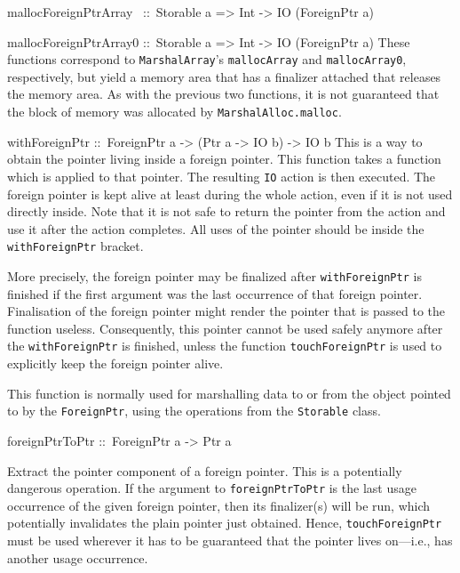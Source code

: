 \documentclass[a4paper,twoside]{article}
\makeatletter
\newcommand{\code}[1]{\texttt{#1}}      %
\newenvironment{codedesc}{%
  \list{}{\labelwidth\z@
    \let\makelabel\codedesclabel}
  }{%
  \endlist
  }
\newcommand*{\codedesclabel}[1]{%
  \hspace{-\leftmargin}
  \parbox[b]{\labelwidth}{\makebox[0pt][l]{\code{#1}}\\}\hfil\relax
  }
\newcommand{\combineitems}{\vspace*{-\itemsep}\vspace*{-\parsep}\vspace*{-1em}}
\makeatother
\begin{document}
\begin{codedesc}
\item[mallocForeignPtrArray~ ::\ Storable a => Int -> IO (ForeignPtr a)]
\item[mallocForeignPtrArray0 ::\ Storable a => Int -> IO (ForeignPtr a)]%
  \combineitems These functions correspond to \code{MarshalArray}'s
  \code{mallocArray} and \code{mallocArray0}, respectively, but yield a memory
  area that has a finalizer attached that releases the memory area.  As with
  the previous two functions, it is not guaranteed that the block of memory
  was allocated by \code{MarshalAlloc.malloc}.
  
\item[withForeignPtr ::\ ForeignPtr a -> (Ptr a -> IO b) -> IO b]
  This is a way to obtain the pointer living inside a foreign pointer. This
  function takes a function which is applied to that pointer. The resulting
  \code{IO} action is then executed. The foreign pointer is kept alive at least
  during the whole action, even if it is not used directly inside. Note that
  it is not safe to return the pointer from the action and use it after the
  action completes.  All uses of the pointer should be inside the
  \code{withForeignPtr} bracket.

  More precisely, the foreign pointer may be finalized after
  \code{withForeignPtr} is finished if the first argument was the last
  occurrence of that foreign pointer.  Finalisation of the foreign pointer
  might render the pointer that is passed to the function useless.
  Consequently, this pointer cannot be used safely anymore after the
  \code{withForeignPtr} is finished, unless the function
  \code{touchForeignPtr} is used to explicitly keep the foreign pointer alive.
  
  This function is normally used for marshalling data to or from the object
  pointed to by the \code{ForeignPtr}, using the operations from the
  \code{Storable} class.

\item[foreignPtrToPtr ::\ ForeignPtr a -> Ptr a]
  
  Extract the pointer component of a foreign pointer. This is a potentially
  dangerous operation.  If the argument to \code{foreignPtrToPtr} is the last
  usage occurrence of the given foreign pointer, then its finalizer(s) will be
  run, which potentially invalidates the plain pointer just obtained.  Hence,
  \code{touchForeignPtr} must be used wherever it has to be guaranteed that
  the pointer lives on---i.e., has another usage occurrence.


\end{codedesc}
\end{document}
